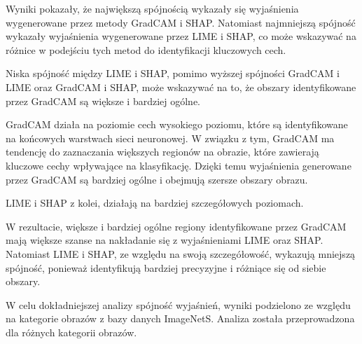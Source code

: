 Wyniki pokazały, że największą spójnością wykazały się wyjaśnienia wygenerowane przez metody GradCAM i SHAP.
Natomiast najmniejszą spójność wykazały wyjaśnienia wygenerowane przez LIME i SHAP, co może wskazywać na różnice w podejściu tych metod do identyfikacji kluczowych cech.

Niska spójność między LIME i SHAP, pomimo wyższej spójności GradCAM i LIME oraz GradCAM i SHAP, może wskazywać na to, że obszary identyfikowane przez GradCAM są większe i bardziej ogólne.

GradCAM działa na poziomie cech wysokiego poziomu, które są identyfikowane na końcowych warstwach sieci neuronowej.
W związku z tym, GradCAM ma tendencję do zaznaczania większych regionów na obrazie, które zawierają kluczowe cechy wpływające na klasyfikację.
Dzięki temu wyjaśnienia generowane przez GradCAM są bardziej ogólne i obejmują szersze obszary obrazu.

LIME i SHAP z kolei, działają na bardziej szczegółowych poziomach.

W rezultacie, większe i bardziej ogólne regiony identyfikowane przez GradCAM mają większe szanse na nakładanie się z wyjaśnieniami LIME oraz SHAP.
Natomiast LIME i SHAP, ze względu na swoją szczegółowość, wykazują mniejszą spójność, ponieważ identyfikują bardziej precyzyjne i różniące się od siebie obszary.

\vspace{1cm}

W celu dokładniejszej analizy spójność wyjaśnień, wyniki podzielono ze względu na kategorie obrazów z bazy danych ImageNetS.
Analiza została przeprowadzona dla różnych kategorii obrazów.

